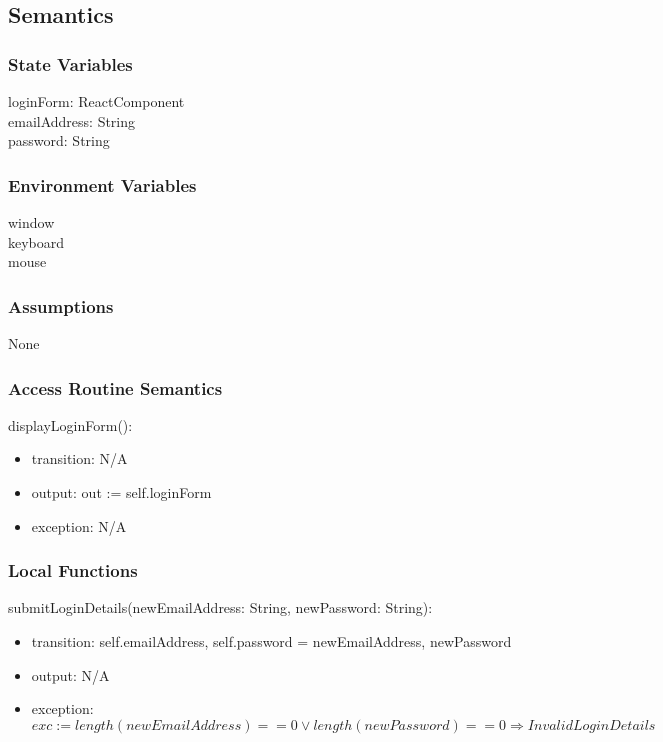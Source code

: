 \documentclass[12pt, titlepage]{article}
\begin{document}
\subsection{Semantics}

\subsubsection{State Variables}

loginForm: ReactComponent \\
emailAddress: String \\
password: String

\subsubsection{Environment Variables}

window \\
keyboard \\
mouse

\subsubsection{Assumptions}

None

\subsubsection{Access Routine Semantics}

\noindent displayLoginForm():
\begin{itemize}
\item transition: N/A
\item output: out := self.loginForm 
\item exception: N/A
\end{itemize}

\subsubsection{Local Functions}

\noindent submitLoginDetails(newEmailAddress: String, newPassword: String):
\begin{itemize}
\item transition: self.emailAddress, self.password = newEmailAddress, newPassword
\item output: N/A
\item exception: $exc := length(newEmailAddress) == 0 \vee length(newPassword) == 0 \Rightarrow InvalidLoginDetails$
\end{itemize}
\end{document}
